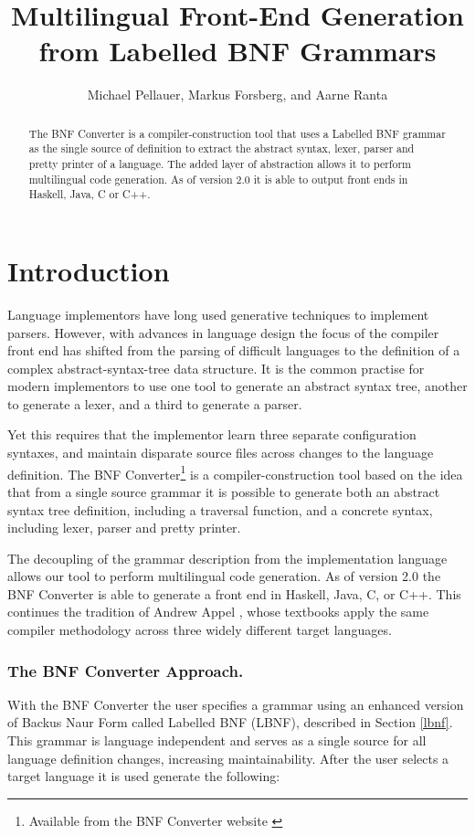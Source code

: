 \documentclass{llncs}
\title{{\Large \bf Multilingual Front-End Generation\\ from Labelled BNF Grammars}}
\author{Michael Pellauer, Markus Forsberg, and Aarne Ranta}
\institute{%
  Chalmers University of Technology,\\
  Department of Computing Science\\
  SE-412 96 Gothenburg, Sweden,\\
  \texttt{\lbr{}pellauer, markus, aarne\rbr{}@cs.chalmers.se}}
\newcommand{\shortsection}[1]{\subsubsection*{#1.}} %
\begin{document}
\maketitle


\begin{abstract}
The BNF Converter is a compiler-construction tool that uses a Labelled BNF
grammar as the single source of definition to extract the abstract syntax,
lexer, parser and pretty printer of a language. The added layer of abstraction allows it
to perform multilingual code generation. As of version 2.0 it is able to
output front ends in Haskell, Java, C or C++.
\end{abstract}

\section{Introduction}


Language implementors have long used generative techniques to implement
parsers. However, with advances in language design the focus of the
compiler front end has shifted from the parsing of difficult languages to
the definition of a complex abstract-syntax-tree data structure. It is the
common practise for modern implementors to use one tool to generate an abstract
syntax tree, another to generate a lexer, and a third to generate a
parser.

Yet this requires that the implementor learn three separate configuration
syntaxes, and maintain disparate source files across changes to the
language definition. The BNF Converter\footnote{
Available from the BNF Converter website \cite{bnfcsite}
}
is a compiler-construction tool based on the idea that from a single
source grammar it is possible to generate both an abstract syntax tree
definition, including a traversal function, and a concrete syntax, 
including lexer, parser and pretty printer.


The decoupling of the grammar description from the implementation language
allows our tool to perform multilingual code generation. As of version 2.0
the BNF Converter is able to generate a front end in Haskell, Java, C, or
C++. This continues the tradition of Andrew Appel
\cite{AppelC,AppelJ,appel}, whose textbooks apply the same compiler
methodology across three widely different target languages.

\shortsection{The BNF Converter Approach}


With the BNF Converter the user specifies a grammar using an enhanced
version of Backus Naur Form called Labelled BNF (LBNF), described in
Section \ref{lbnf}. This grammar is language independent and serves as a
single source for all language definition changes, increasing
maintainability. After the user selects a target language it is used
generate the following:
\end{document}
